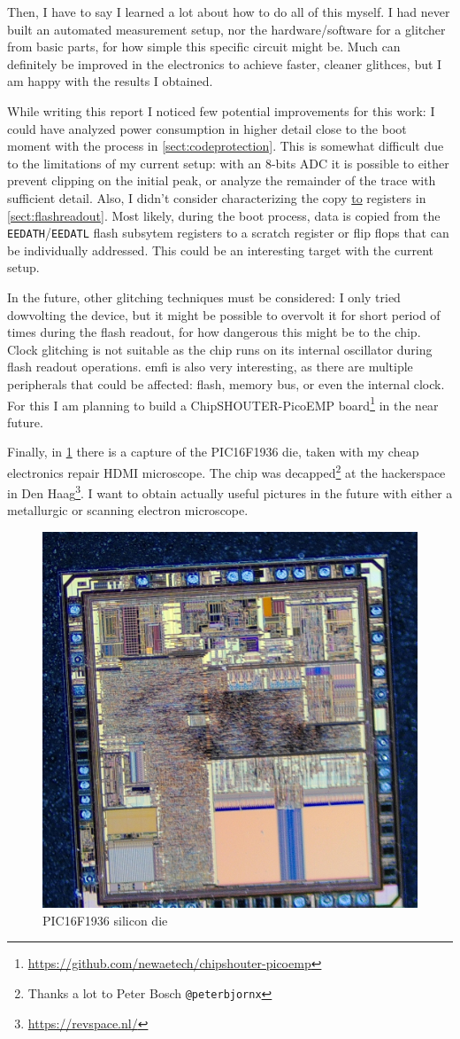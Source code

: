 \documentclass[a4paper,english,twoside,10pt]{article}
\begin{document}
Then, I have to say I learned a lot about how to do all of this myself. I had never built an automated measurement setup, nor the hardware/software for a glitcher from basic parts, for how simple this specific circuit might be. Much can definitely be improved in the electronics to achieve faster, cleaner glithces, but I am happy with the results I obtained.

While writing this report I noticed few potential improvements for this work: I could have analyzed power consumption in higher detail close to the boot moment with the process in \cref{sect:codeprotection}. This is somewhat difficult due to the limitations of my current setup: with an 8-bits ADC it is possible to either prevent clipping on the initial peak, or analyze the remainder of the trace with sufficient detail. Also, I didn't consider characterizing the copy \underline{to} registers in \cref{sect:flashreadout}. Most likely, during the boot process, data is copied from the \texttt{EEDATH}/\texttt{EEDATL} flash subsytem registers to a scratch register or flip flops that can be individually addressed. This could be an interesting target with the current setup.

In the future, other glitching techniques must be considered: I only tried dowvolting the device, but it might be possible to overvolt it for short period of times during the flash readout, for how dangerous this might be to the chip. Clock glitching is not suitable as the chip runs on its internal oscillator during flash readout operations. \gls{emfi} is also very interesting, as there are multiple peripherals that could be affected: flash, memory bus, or even the internal clock. For this I am planning to build a ChipSHOUTER-PicoEMP board\footnote{\url{https://github.com/newaetech/chipshouter-picoemp}} in the near future.

Finally, in \cref{fig:pic_die} there is a capture of the PIC16F1936 die, taken with my cheap electronics repair HDMI microscope. The chip was decapped\footnote{Thanks a lot to Peter Bosch \texttt{@peterbjornx}} at the hackerspace in Den Haag\footnote{\url{https://revspace.nl/}}. I want to obtain actually useful pictures in the future with either a metallurgic or scanning electron microscope.

\begin{figure}[htbp]
	\centering%
	\includegraphics[width=.55\textwidth]{pic_die_HDMI_microscope.jpg}
	\caption{PIC16F1936 silicon die}
	\label{fig:pic_die}
\end{figure}
\end{document}
